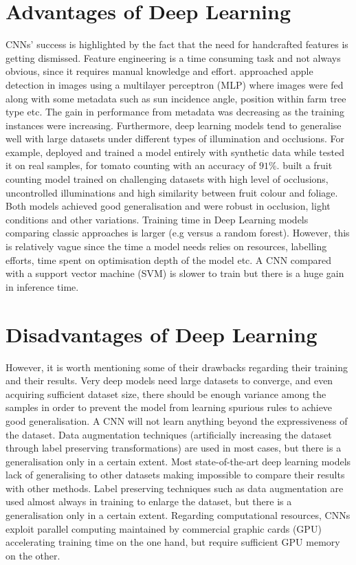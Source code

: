 \section{Advantages of Deep Learning}
CNNs' success is highlighted by the fact that the need for handcrafted features is getting dismissed. Feature engineering is a time consuming task and not always obvious, since it requires manual knowledge and effort. \cite{bargoti2016image} approached apple detection in images using a multilayer perceptron (MLP) where images were fed along with some metadata such as sun incidence angle, position within farm tree type etc. The gain in performance from metadata was decreasing as the training instances were increasing. Furthermore, deep learning models tend to generalise well with large datasets under different types of illumination and occlusions. For example, \cite{rahnemoonfar2017deep} deployed and trained a model entirely with synthetic data while tested it on real samples, for tomato counting with an accuracy of $91\%$. \cite{chen2017counting} built a fruit counting model trained on challenging datasets with high level of occlusions, uncontrolled illuminations and high similarity between fruit colour and foliage. Both models achieved good generalisation and were robust in occlusion, light conditions and other variations. Training time in Deep Learning models comparing classic approaches is larger (e.g versus a random forest). However, this is relatively vague since the time a model needs relies on resources,  labelling efforts, time spent on optimisation depth of the model etc. A CNN compared with a support vector machine (SVM) is slower to train but there is a huge gain in inference time.

\section{Disadvantages of Deep Learning}
However, it is worth mentioning some of their drawbacks regarding their training and their results. Very deep models need large datasets to converge, and even acquiring sufficient dataset size, there should be enough variance among the samples in order to prevent the model from learning spurious rules to achieve good generalisation. A CNN will not learn anything beyond the expressiveness of the dataset. Data augmentation techniques (artificially increasing the dataset through label preserving transformations) are used in most cases, but there is a generalisation only in a certain extent. Most state-of-the-art deep learning models lack of generalising to other datasets making impossible to compare their results with other methods. Label preserving techniques such as data augmentation are used almost always in training to enlarge the dataset, but there is a generalisation only in a certain extent.  Regarding computational resources, CNNs exploit parallel computing maintained by commercial graphic cards (GPU) accelerating training time on the one hand, but require sufficient GPU memory on the other.


